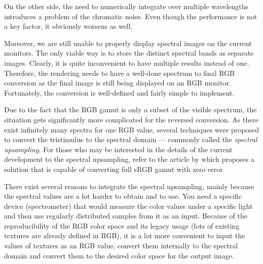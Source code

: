 On the other side, the need to numerically integrate over multiple wavelengths introduces a problem of the chromatic noise. Even though the performance is not a key factor, it obviously worsens as well. 

Moreover, we are still unable to properly display spectral images on the current monitors. The only viable way is to store the distinct spectral bands as separate images. Clearly, it is quite inconvenient to have multiple results instead of one. Therefore, the rendering needs to have a well-done spectrum to final RGB conversion as the final image is still being displayed on an RGB monitor. Fortunately, the conversion is well-defined and fairly simple to implement.

Due to the fact that the RGB gamut is only a subset of the visible spectrum, the situation gets significantly more complicated for the reversed conversion. As there exist infinitely many spectra for one RGB value, several techniques were proposed to convert the tristimulus to the spectral domain --- commonly called the \emph{spectral upsampling}. For those who may be interested in the details of the current development to the spectral upsampling, refer to the article by \citet{jakob2019low} which proposes a solution that is capable of converting full sRGB gamut with zero error. 

There exist several reasons to integrate the spectral upsampling, mainly because the spectral values are a lot harder to obtain and to use. You need a specific device (spectrometer) that would measure the color values under a specific light and then use regularly distributed samples from it as an input. Because of the reproducibility of the RGB color space and its legacy usage (lots of existing textures are already defined in RGB), it is a lot more convenient to input the values of textures as an RGB value, convert them internally to the spectral domain and convert them to the desired color space for the output image.


